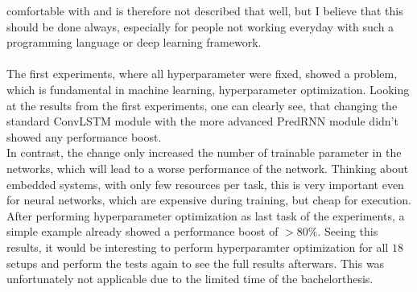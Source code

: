  comfortable with and is therefore not described that well, but I believe that this should be done always, especially for people not working everyday with such a 
 programming language or deep learning framework.
 \\\\
 The first experiments, where all hyperparameter were fixed, showed a problem, which is fundamental in machine learning, hyperparameter optimization. Looking at
 the results from the first experiments, one can clearly see, that changing the standard ConvLSTM module with the more advanced PredRNN module didn't
 showed any performance boost.\\In contrast, the change only increased the number of trainable parameter in the networks, which will lead to a worse performance
 of the network. Thinking about embedded systems, with only few resources per task, this is very important even for neural networks, which are expensive during
 training, but cheap for execution. After performing hyperparameter optimization as last task of the experiments, a simple example already showed a performance
 boost of $> 80\%$. Seeing this results, it would be interesting to perform hyperparamter optimization for all $18$ setups and perform the tests again to
 see the full results afterwars. This was unfortunately not applicable due to the limited time of the bachelorthesis.